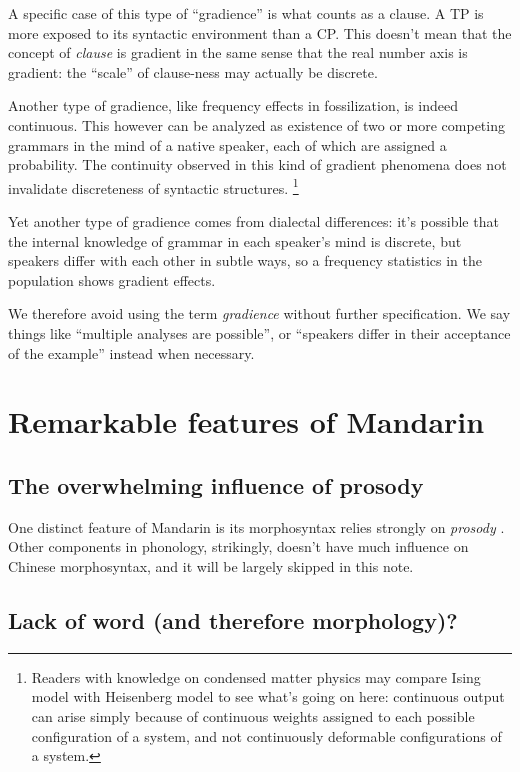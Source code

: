 \documentclass[UTF8, a4paper, oneside, scheme=plain, 12pt]{ctexrep}
\newcommand*{\term}[1]{\emph{#1}}
\begin{document}
{A specific case of this type of ``gradience'' is what counts as a clause.
A TP is more exposed to its syntactic environment than a CP.
This doesn't mean that the concept of \term{clause} is gradient
in the same sense that the real number axis is gradient:
the ``scale'' of clause-ness may actually be discrete.

Another type of gradience, like frequency effects in fossilization, is indeed continuous.
This however can be analyzed as existence of two or more competing grammars in the mind of a native speaker,
each of which are assigned a probability.
The continuity observed in this kind of gradient phenomena
does not invalidate discreteness of syntactic structures.%
\footnote{
    Readers with knowledge on condensed matter physics may compare Ising model with Heisenberg model
    to see what's going on here:
    continuous output can arise simply because of continuous weights assigned to each possible configuration of a system,
    and not continuously deformable configurations of a system.
}

Yet another type of gradience comes from dialectal differences:
it's possible that the internal knowledge of grammar in each speaker's mind is discrete,
but speakers differ with each other in subtle ways,
so a frequency statistics in the population shows gradient effects.

We therefore avoid using the term \term{gradience} without further specification.
We say things like ``multiple analyses are possible'', or ``speakers differ in their acceptance of the example'' instead when necessary.

}

\section{Remarkable features of Mandarin}

\subsection{The overwhelming influence of prosody}

One distinct feature of Mandarin is its morphosyntax relies strongly on \emph{prosody} \citep{feng2000}. 
Other components in phonology, strikingly, 
doesn't have much influence on Chinese morphosyntax,
and it will be largely skipped in this note.

\subsection{Lack of word (and therefore morphology)?}
\end{document}
